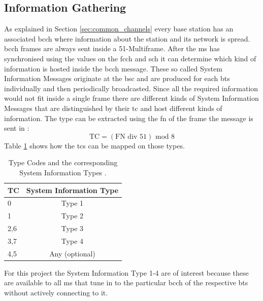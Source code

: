 \subsection{Information Gathering}
\label{sec:info_gathering}
As explained in Section \ref{sec:common_channels} every base station has an associated \gls{bcch} where information about the station and its network is spread.
\gls{bcch} frames are always sent inside a 51-Multiframe.
After the \gls{ms} has synchronised using the values on the \gls{fcch} and \gls{sch} it can determine which kind of information is hosted inside the \gls{bcch} message.
These so called System Information Messages originate at the \gls{bsc} and are produced for each \gls{bts} individually and then periodically broadcasted.
Since all the required information would not fit inside a single frame there are different kinds of System Information Messages that are distinguished by their \gls{tc} and host different kinds of information.
The type can be extracted using the \gls{fn} of the frame the message is sent in \cite{GSM2009}:
\[\text{TC}=(\text{FN} \text{ div } 51)\text{ mod } 8\]
Table \ref{tab:tc_mapping} shows how the \glspl{tc} can be mapped on those types.
\begin{table}
\centering
\begin{tabular}{lc}
\toprule
TC		&System Information Type\\
\midrule
0		&Type 1\\
1		&Type 2\\
2,6		&Type 3\\
3,7		&Type 4\\
4,5		&Any (optional)\\
\bottomrule
\end{tabular}
\caption{Type Codes and the corresponding System Information Types \cite{GSM2009}.}
\label{tab:tc_mapping}
\end{table}
For this project the System Information Type 1-4 are of interest because these are available to all \gls{ms} that tune in to the particular \gls{bcch} of the respective \gls{bts} without actively connecting to it.

